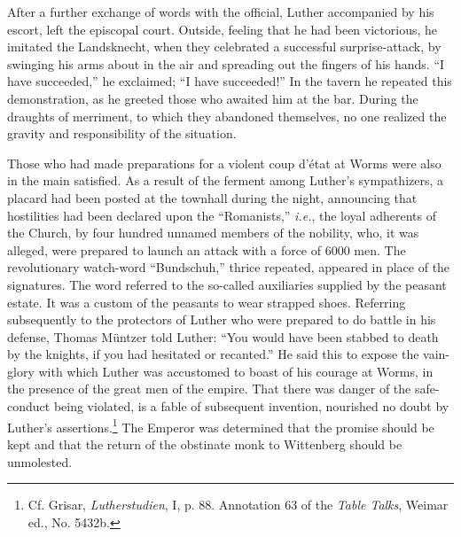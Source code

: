 After a further exchange of words with the official, Luther accompanied
by his escort, left the episcopal court. Outside, feeling
that he had been victorious, he imitated the Landsknecht, when they
celebrated a successful surprise-attack, by swinging his arms about
in the air and spreading out the fingers of his hands. “I have succeeded,”
he exclaimed; “I have succeeded!” In the tavern he repeated this demonstration,
as he greeted those who awaited him at
the bar. During the draughts of merriment, to which they abandoned
themselves, no one realized the gravity and responsibility of the
situation.

Those who had made preparations for a violent coup d’état at
Worms were also in the main satisfied. As a result of the ferment
among Luther’s sympathizers, a placard had been posted at the townhall
during the night, announcing that hostilities had been declared
upon the “Romanists,” \textit{i.e.}, the loyal adherents of the Church, by
four hundred unnamed members of the nobility, who, it was alleged,
were prepared to launch an attack with a force of 6000 men. The
revolutionary watch-word “Bundschuh,” thrice repeated, appeared
in place of the signatures. The word referred to the so-called auxiliaries
supplied by the peasant estate. It was a custom of the peasants to
wear strapped shoes. Referring subsequently to the protectors of
Luther who were prepared to do battle in his defense, Thomas Müntzer
told Luther: “You would have been stabbed to death by the
knights, if you had hesitated or recanted.” He said this to
expose the vain-glory with which Luther was accustomed to boast of
his courage at Worms, in the presence of the great men
of the empire.
That there was danger of the safe-conduct being violated, is a fable
of subsequent invention, nourished no doubt by Luther’s assertions.\footnote
{Cf. Grisar, \textit{Lutherstudien}, I, p. 88. Annotation 63 of the \textit{Table Talks}, Weimar ed., No.
5432b.}
The Emperor was determined that the promise should be kept and
that the return of the obstinate monk to Wittenberg should be
unmolested.

